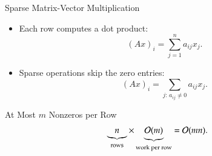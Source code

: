 \documentclass[10pt]{beamer}
\begin{document}

\begin{frame}{Sparse Matrix-Vector Multiplication}

\begin{itemize}
    \item Each row computes a dot product:
    \[
        (Ax)_i=\sum_{j=1}^{n}a_{ij}x_j.
    \]

    \item Sparse operations skip the zero entries:
    \[
        (Ax)_i=\sum_{j:\,a_{ij}\ne0}a_{ij}x_j.
    \]
\end{itemize}

\begin{block}{At Most $m$ Nonzeros per Row}
\[
    \underbrace{n}_{\text{rows}}
    \times
    \underbrace{{\mathcal{O}}(m)}_{\text{work per row}}
    ={\mathcal{O}}(mn).
\]
\end{block}


\end{frame}


    


\end{document}
